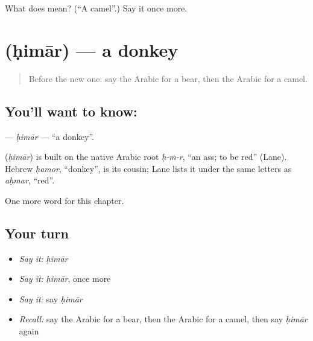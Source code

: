 \begin{tcolorbox}[breakable,colback=teal!4,colframe=teal!35!black,title={Before you move on}]
What does  mean? (\textquotedblleft{}A camel\textquotedblright{}.) Say it once more.
\end{tcolorbox}
\section[\texorpdfstring{\ar{حمار} (ḥimār)}{حمار (ḥimār)}]{ (ḥimār) — a donkey}

\label{lesson:AR-C81-himar}



\begin{quote}
Before the new one: say the Arabic for a bear, then the Arabic for a camel.
\end{quote}

\subsection*{You'll want to know: }
\textbf{} — \emph{ḥimār} — \textquotedblleft{}a donkey\textquotedblright{}.

\begin{cousinweb}
\textbf{} (\emph{ḥimār}) is built on the native Arabic root \emph{ḥ-m-r}, \textquotedblleft{}an ass; to be red\textquotedblright{} (Lane). Hebrew \emph{ḥamor}, \textquotedblleft{}donkey\textquotedblright{}, is its cousin; Lane lists it under the same letters as \emph{aḥmar}, \textquotedblleft{}red\textquotedblright{}.
\end{cousinweb}

\begin{grammarlens}[title={What you've built}]
One more word for this chapter.
\end{grammarlens}

\subsection*{Your turn}
\begin{itemize}
\raggedright
  \item \emph{Say it:} \emph{ḥimār}
  \item \emph{Say it:} \emph{ḥimār}, once more
  \item \emph{Say it:} say \emph{ḥimār}
  \item \emph{Recall:} say the Arabic for a bear, then the Arabic for a camel, then say \emph{ḥimār} again
\end{itemize}

